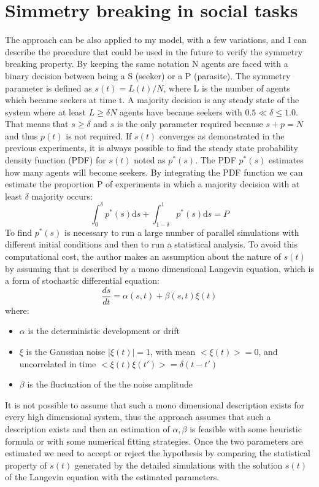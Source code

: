 
\section{Simmetry breaking in social tasks}

The approach can be also applied to my model, with a few variations, and I
 can describe the procedure that could be used in the future to verify
 the symmetry breaking property.
By keeping the same notation N agents are faced with a binary decision between
 being a S (seeker) or a P (parasite).
The symmetry parameter is defined as $s(t)=L(t)/N$, where L is the number of
agents which became seekers at time t.
A majority decision is any steady state of the system where at least $L \geq \delta N$
agents have became seekers with $0.5 \ll \delta \leq 1.0$.
That means that $s \geq \delta$ and $s$ is the only parameter required
because $s+p=N$ and thus $p(t)$ is not required.
If $s(t)$ converges as demonstrated in the previous experiments, it is always
possible to find the steady state probability density function (PDF) for $s(t)$
noted as $p^*(s)$.
The PDF $p^*(s)$ estimates how many agents will become seekers.
By integrating the PDF function we can estimate the proportion P of
experiments in which a majority decision with at least $\delta$ majority occurs:
\begin{equation}
\int_0^\delta p^*(s) \mathrm{d}s + \int_{1-\delta}^1 p^*(s) \mathrm{d}s=P
\end{equation}
To find $p^*(s)$ is necessary to run a large number of parallel simulations
with different initial conditions and then to run a statistical analysis.
To avoid this computational cost, the author \citet{Hamann2010:modelsimmetry} makes an assumption
about the nature of $s(t)$ by assuming that is described by a
mono dimensional Langevin equation, which is a form of stochastic differential
equation:
\begin{equation}
\frac{ds}{dt}=\alpha(s,t)+\beta(s,t) \xi(t)
\label{eq:langevin}
\end{equation}
where:
\begin{itemize}
 \item $\alpha$ is the deterministic development or drift
 \item $\xi$ is the Gaussian noise $|\xi(t)|=1$, with mean $<\xi(t)>=0$,
and uncorrelated in time $<\xi(t)\xi(t')>=\delta(t-t')$
 \item $\beta$ is the fluctuation of the the noise amplitude
\end{itemize}
It is not possible to assume that such a mono dimensional
description exists for every high dimensional system, thus
the approach assumes that such a description exists
and then an estimation of $\alpha,\beta$ is feasible with some heuristic formula
or with some numerical fitting strategies.
Once the two parameters are estimated we need to accept or
reject the hypothesis by comparing the statistical property of
$s(t)$ generated by the detailed simulations with the solution
$s(t)$ of the Langevin equation with the estimated parameters.

